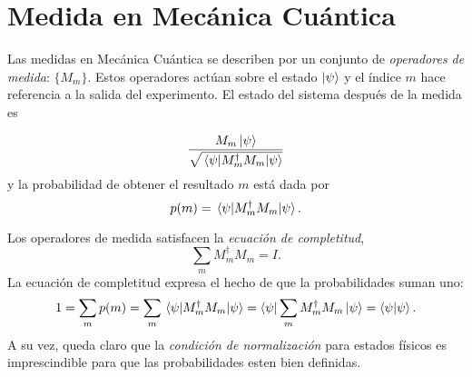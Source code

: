 

\section{Medida en Mecánica Cuántica} \label{medidas}

\begin{postulate}
  Las medidas en Mecánica Cuántica se describen por un conjunto de \emph{operadores de medida}: $\{M_m\}$. Estos operadores actúan sobre el estado $\ket{\psi}$ y el índice $m$ hace referencia a la salida del experimento. El estado del sistema después de la medida es 
  
\begin{equation*}
    \frac{M_m\ket{\psi}}{\sqrt{\mel{\psi}{M_m^\dagger M_m}{\psi}}}
\end{equation*}
 y la probabilidad de obtener el resultado $m$ 
está dada por 
\begin{equation*}
    p(m) = \mel{\psi}{M_m^\dagger M_m}{\psi}.
\end{equation*}

Los operadores de medida satisfacen la \emph{ecuación de completitud},
  \begin{equation*}
    \sum_m M_m^\dagger M_m = I.
  \end{equation*}
  La ecuación de completitud expresa el hecho de que la probabilidades suman uno:
  \begin{equation*}
    1 = \sum_mp(m) = \sum_m\mel{\psi}{M_m^\dagger M_m}{\psi}=\bra{\psi}\sum_m M_m^\dagger M_m\ket{\psi}=\bra{\psi}\ket{\psi}  .
  \end{equation*}
A su vez, queda claro que la \textit{condición de normalización} para estados físicos es imprescindible para que las probabilidades esten bien definidas. 
  
\end{postulate}

